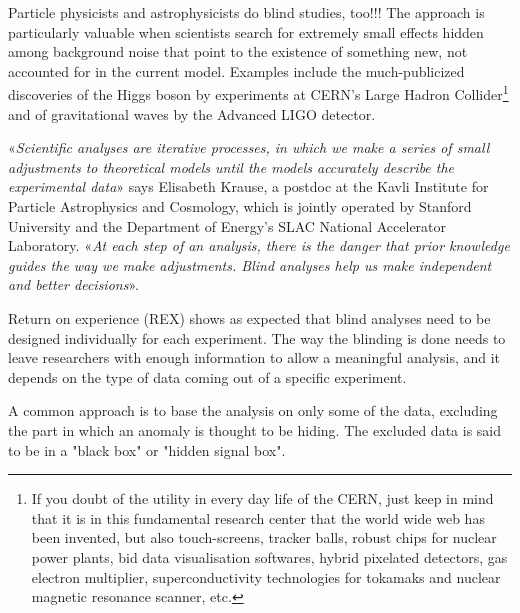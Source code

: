 	Particle physicists and astrophysicists do blind studies, too!!! The approach is particularly valuable when scientists search for extremely small effects hidden among background noise that point to the existence of something new, not accounted for in the current model. Examples include the much-publicized discoveries of the Higgs boson by experiments at CERN's Large Hadron Collider\footnote{If you doubt of the utility in every day life of the CERN, just keep in mind that it is in this fundamental research center that the world wide web has been invented, but also touch-screens, tracker balls, robust chips for nuclear power plants, bid data visualisation softwares, hybrid pixelated detectors, gas electron multiplier, superconductivity technologies for tokamaks and nuclear magnetic resonance scanner, etc.} and of gravitational waves by the Advanced LIGO detector.
	
	«\textit{Scientific analyses are iterative processes, in which we make a series of small adjustments to theoretical models until the models accurately describe the experimental data}» says Elisabeth Krause, a postdoc at the Kavli Institute for Particle Astrophysics and Cosmology, which is jointly operated by Stanford University and the Department of Energy's SLAC National Accelerator Laboratory. «\textit{At each step of an analysis, there is the danger that prior knowledge guides the way we make adjustments. Blind analyses help us make independent and better decisions}».
	
	Return on experience (REX) shows as expected that blind analyses need to be designed individually for each experiment. The way the blinding is done needs to leave researchers with enough information to allow a meaningful analysis, and it depends on the type of data coming out of a specific experiment.

	A common approach is to base the analysis on only some of the data, excluding the part in which an anomaly is thought to be hiding. The excluded data is said to be in a "black box" or "hidden signal box".

